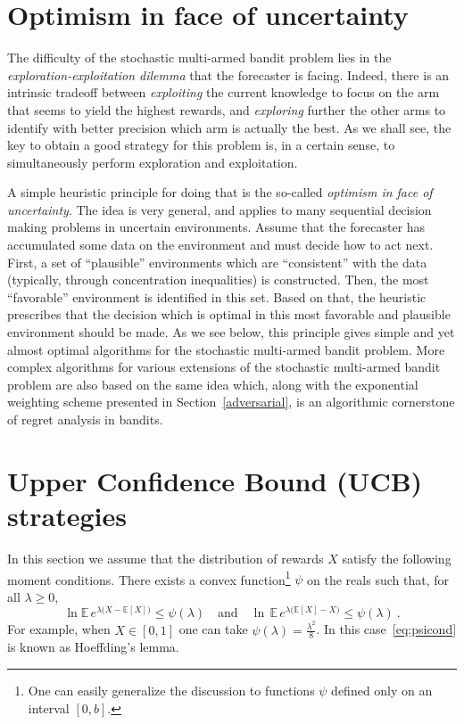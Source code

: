 \documentclass[11pt]{hackednow}
\newcommand{\E}{\mathbb{E}}
\begin{document}
\section{Optimism in face of uncertainty}
The difficulty of the stochastic multi-armed bandit problem lies in the {\em exploration-exploitation dilemma} that the forecaster is facing. Indeed, there is an intrinsic tradeoff between {\em exploiting} the current knowledge to focus on the arm that seems to yield the highest rewards, and {\em exploring} further the other arms to identify with better precision which arm is actually the best. As we shall see, the key to obtain a good strategy for this problem is, in a certain sense, to simultaneously perform exploration and exploitation.

A simple heuristic principle for doing that is the so-called {\em optimism in face of uncertainty}. The idea is very general, and applies to many sequential decision making problems in uncertain environments. Assume that the forecaster has accumulated some data on the environment and must decide how to act next. First, a set of ``plausible'' environments which are ``consistent'' with the data (typically, through concentration inequalities) is constructed. Then, the most ``favorable'' environment is identified in this set. Based on that, the heuristic prescribes that the decision which is optimal in this most favorable and plausible environment should be made. As we see below, this principle gives simple and yet almost optimal algorithms for the stochastic multi-armed bandit problem. More complex algorithms for various extensions of the stochastic multi-armed bandit problem are also based on the same idea which, along with the exponential weighting scheme presented in Section~\ref{adversarial}, is an algorithmic cornerstone of regret analysis in bandits. 

\section{Upper Confidence Bound (UCB) strategies} \label{sec:UCB}
In this section we assume that the distribution of rewards $X$ satisfy the following moment conditions. There exists a convex function\footnote{
One can easily generalize the discussion to functions $\psi$ defined only on an interval $[0,b]$.
}
$\psi$ on the reals such that, for all $\lambda \geq 0$,
\begin{equation} \label{eq:psicond}
\ln \E\,e^{\lambda \bigl(X-\E[X]\bigr)} \leq \psi(\lambda) \quad\text{and}\quad  \ln\,\E\,e^{\lambda \bigl(\E[X] - X\bigr)} \leq \psi(\lambda)~.
\end{equation}
For example, when $X \in [0,1]$ one can take $\psi(\lambda) = \tfrac{\lambda^2}{8}$. In this case~\eqref{eq:psicond} is known as Hoeffding's lemma.
\end{document}
